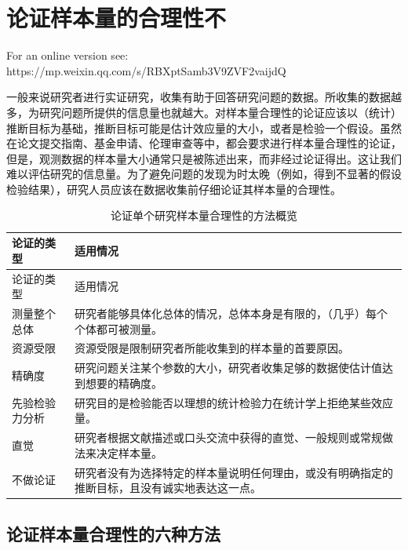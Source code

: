 \documentclass[
  letterpaper,
  DIV=11,
  numbers=noendperiod]{scrreprt}
\begin{document}

\hypertarget{sec-power}{%
\chapter{论证样本量的合理性不}\label{sec-power}}

For an online version see:
https://mp.weixin.qq.com/s/RBXptSamb3V9ZVF2vaijdQ

一般来说研究者进行实证研究，收集有助于回答研究问题的数据。所收集的数据越多，为研究问题所提供的信息量也就越大。对样本量合理性的论证应该以（统计）推断目标为基础，推断目标可能是估计效应量的大小，或者是检验一个假设。虽然在论文提交指南、基金申请、伦理审查等中，都会要求进行样本量合理性的论证，但是，观测数据的样本量大小通常只是被陈述出来，而非经过论证得出。这让我们难以评估研究的信息量。为了避免问题的发现为时太晚（例如，得到不显著的假设检验结果），研究人员应该在数据收集前仔细论证其样本量的合理性。

\hypertarget{tbl-table-pow-just}{}
\begin{longtable}[]{@{}ll@{}}
\caption{\label{tbl-table-pow-just}论证单个研究样本量合理性的方法概览}\tabularnewline
\toprule\noalign{}
论证的类型 & 适用情况 \\
\midrule\noalign{}
\endfirsthead
\toprule\noalign{}
论证的类型 & 适用情况 \\
\midrule\noalign{}
\endhead
\bottomrule\noalign{}
\endlastfoot
测量整个总体 &
研究者能够具体化总体的情况，总体本身是有限的，（几乎）每个个体都可被测量。 \\
资源受限 & 资源受限是限制研究者所能收集到的样本量的首要原因。 \\
精确度 &
研究问题关注某个参数的大小，研究者收集足够的数据使估计值达到想要的精确度。 \\
先验检验力分析 &
研究目的是检验能否以理想的统计检验力在统计学上拒绝某些效应量。 \\
直觉 &
研究者根据文献描述或口头交流中获得的直觉、一般规则或常规做法来决定样本量。 \\
不做论证 &
研究者没有为选择特定的样本量说明任何理由，或没有明确指定的推断目标，且没有诚实地表达这一点。 \\
\end{longtable}

\hypertarget{ux8bbaux8bc1ux6837ux672cux91cfux5408ux7406ux6027ux7684ux516dux79cdux65b9ux6cd5}{%
\section{论证样本量合理性的六种方法}\label{ux8bbaux8bc1ux6837ux672cux91cfux5408ux7406ux6027ux7684ux516dux79cdux65b9ux6cd5}}
\end{document}
